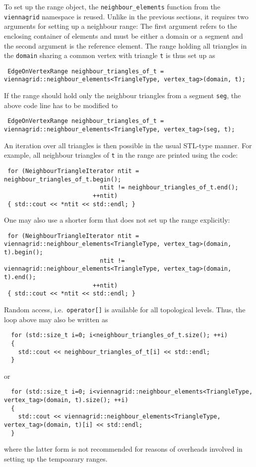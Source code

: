 To set up the range object, the \lstinline|neighbour_elements| function from the \lstinline|viennagrid| namespace is reused. Unlike in the previous sections, it requires two arguments
for setting up a neighbour range: The first argument refers to the enclosing container of elements and must be either a domain or a segment and the second argument is the reference element.
The range holding all triangles in the \lstinline|domain| sharing a common vertex with triangle \lstinline|t| is thus set up as
\begin{lstlisting}
 EdgeOnVertexRange neighbour_triangles_of_t = viennagrid::neighbour_elements<TriangleType, vertex_tag>(domain, t);
\end{lstlisting}
If the range should hold only the neighbour triangles from a segment \lstinline|seg|, the above code line has to be modified to
\begin{lstlisting}
 EdgeOnVertexRange neighbour_triangles_of_t = viennagrid::neighbour_elements<TriangleType, vertex_tag>(seg, t);
\end{lstlisting}
An iteration over all triangles is then possible in the usual STL-type manner. For example, all neighbour triangles of \lstinline|t| in the range are printed using the code:
\begin{lstlisting}
 for (NeighbourTriangleIterator ntit = neighbour_triangles_of_t.begin();
                           ntit != neighbour_triangles_of_t.end();
                         ++ntit)
 { std::cout << *ntit << std::endl; }
\end{lstlisting}
One may also use a shorter form that does not set up the range explicitly:
\begin{lstlisting}
 for (NeighbourTriangleIterator ntit = viennagrid::neighbour_elements<TriangleType, vertex_tag>(domain, t).begin();
                           ntit != viennagrid::neighbour_elements<TriangleType, vertex_tag>(domain, t).end();
                         ++ntit)
 { std::cout << *ntit << std::endl; }
\end{lstlisting}

Random access, i.e.~\lstinline|operator[]| is available for all topological levels. Thus, the loop above may also be written as
\begin{lstlisting}
  for (std::size_t i=0; i<neighbour_triangles_of_t.size(); ++i)
  {
    std::cout << neighbour_triangles_of_t[i] << std::endl;
  }
\end{lstlisting}
or 
\begin{lstlisting}
  for (std::size_t i=0; i<viennagrid::neighbour_elements<TriangleType, vertex_tag>(domain, t).size(); ++i)
  {
    std::cout << viennagrid::neighbour_elements<TriangleType, vertex_tag>(domain, t)[i] << std::endl;
  }
\end{lstlisting}
where the latter form is not recommended for reasons of overheads involved in setting up the tempoarary ranges.
